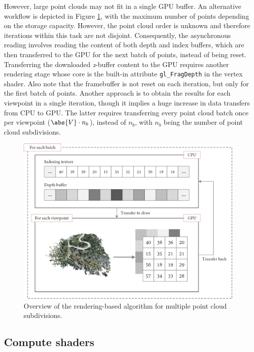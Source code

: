 However, large point clouds may not fit in a single GPU buffer. An alternative workflow is depicted in Figure \ref{fig:occlusion_opengl_zbuffer_multiple_batches}, with the maximum number of points depending on the storage capacity. However, the point cloud order is unknown and therefore iterations within this task are not disjoint. Consequently, the asynchronous reading involves reading the content of both depth and index buffers, which are then transferred to the GPU for the next batch of points, instead of being reset. Transferring the downloaded \textit{z}-buffer content to the GPU requires another rendering stage whose core is the built-in attribute \verb|gl_FragDepth| in the vertex shader. Also note that the framebuffer is not reset on each iteration, but only for the first batch of points. Another approach is to obtain the results for each viewpoint in a single iteration, though it implies a huge increase in data transfers from CPU to GPU. The latter requires transferring every point cloud batch once per viewpoint ($\abs{V} \cdot n_{b}$), instead of $n_{b}$, with $n_{b}$ being the number of point cloud subdivisions.

\begin{figure}[htb]
    \centering
    \includegraphics[width=\linewidth]{figs/multi_thermal_projection/multiple_batches_opengl_gpu.png}
    \caption{Overview of the rendering-based algorithm for multiple point cloud subdivisions.}
    \label{fig:occlusion_opengl_zbuffer_multiple_batches}
\end{figure}

\subsection{Compute shaders}


